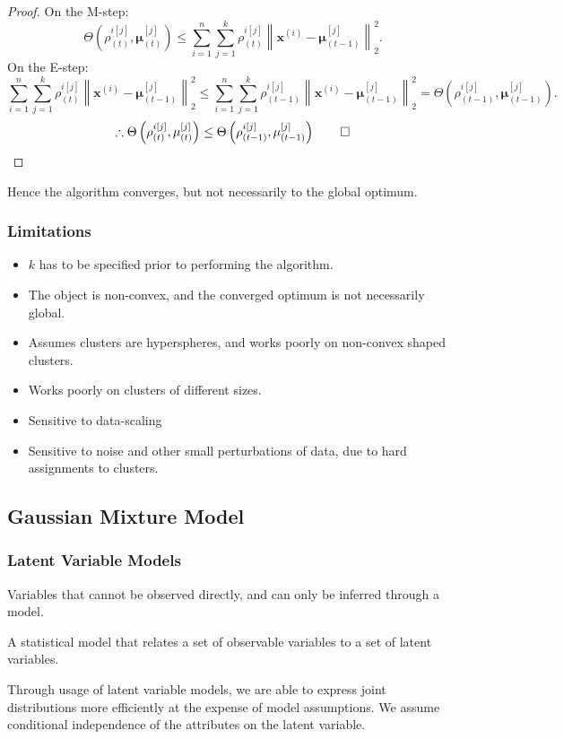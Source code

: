 \begin{itemize}
\begin{proof}
      On the M-step:
      \[\Theta\left( \rho^{i[j]}_{(t)},\mathbf{\mu}^{[j]}_{(t)} \right)\le 
      \sum_{i=1}^{n} \sum_{j=1}^{k} \rho^{i[j]}_{(t)}\left\lVert \mathbf{x}^{(i)}-\mathbf{\mu}_{(t-1)}^{[j]} \right\rVert_2^2.\] 
      On the E-step:
      \[\sum_{i=1}^{n} \sum_{j=1}^{k} \rho^{i[j]}_{(t)}\left\lVert \mathbf{x}^{(i)}-\mathbf{\mu}_{(t-1)}^{[j]} \right\rVert_2^2\le \sum_{i=1}^{n} \sum_{j=1}^{k} \rho^{i[j]}_{(t-1)}\left\lVert \mathbf{x}^{(i)}-\mathbf{\mu}_{(t-1)}^{[j]} \right\rVert_2^2=\Theta\left( \rho^{i[j]}_{(t-1)},\mathbf{\mu}^{[j]}_{(t-1)} \right).\] 
      \[\therefore \Theta\left( \rho^{i[j]}_{(t)},\mathbf{\mu}^{[j]}_{(t)} \right)\le\Theta\left( \rho^{i[j]}_{(t-1)},\mathbf{\mu}^{[j]}_{(t-1)} \right)\qed\] 
    \end{proof}
    Hence the algorithm converges, but not necessarily to the global optimum.
\end{itemize}
\subsubsection{Limitations}
\begin{itemize}
  \item $k$ has to be specified prior to performing the algorithm.
  \item The object is non-convex, and the converged optimum is not necessarily global.
  \item Assumes clusters are hyperspheres, and works poorly on non-convex shaped clusters.
  \item Works poorly on clusters of different sizes.
  \item Sensitive to data-scaling
  \item Sensitive to noise and other small perturbations of data, due to hard
    assignments to clusters.
\end{itemize}
\subsection{Gaussian Mixture Model}
\subsubsection{Latent Variable Models}
\begin{definition}
  Variables that cannot be observed directly, and can only be inferred through
  a model.
\end{definition}
\begin{definition}
  A statistical model that relates a set of observable variables to a set of latent variables.
\end{definition}
Through usage of latent variable models, we are able to express joint
distributions more efficiently at the expense of model assumptions. We assume
conditional independence of the attributes on the latent variable.
